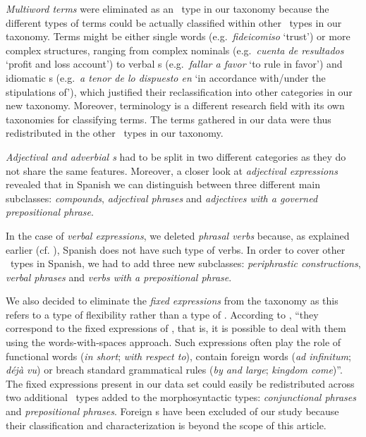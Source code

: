 \documentclass[output=paper]{langsci/langscibook}
\begin{document}
\textit{Multiword terms} were eliminated as an \mwe\ type in our taxonomy because the different types of terms could be actually classified within other \mwe\ types in our taxonomy.
Terms might be either single words (e.g.\ \textit{fideicomiso} `trust') or more complex structures, ranging from complex nominals (e.g.\ \textit{cuenta de resultados} `profit and loss account') to verbal \mwe s (e.g.\ \textit{fallar a favor} `to rule in favor') and idiomatic \mwe s (e.g.\ \textit{a tenor de lo dispuesto en} `in accordance with/under the stipulations of'), which justified their reclassification into other categories in our new taxonomy.
Moreover, terminology is a different research field with its own taxonomies for classifying terms.
The terms gathered in our data were thus redistributed in the other \mwe\ types in our taxonomy.


\textit{Adjectival and adverbial \mwe s} had to be split in two different categories as they do not share the same features.
Moreover, a closer look at \textit{adjectival expressions} revealed that in Spanish we can distinguish between three different main subclasses: \textit{compounds}, \textit{adjectival phrases} and \textit{adjectives with a governed prepositional phrase}.

In the case of \textit{verbal expressions}, we deleted \textit{phrasal verbs} because, as explained earlier (cf. ), Spanish does not have such type of verbs.
In order to cover other \mwe\ types in Spanish, we had to add three new subclasses: \textit{periphrastic constructions}, \textit{verbal phrases} and \textit{verbs with a prepositional phrase}.

We also decided to eliminate the \textit{fixed expressions} from the taxonomy as this refers to a type of flexibility rather than a type of \mwe.
According to \citet{Ramisch:2015}, ``they correspond to the fixed expressions of 
\citet{Sag:2002},
that is, it is possible to deal with them using the words-with-spaces approach. Such expressions often play the role of functional words (\textit{in short}; \textit{with respect to}), contain foreign words (\textit{ad infinitum}; \textit{déjà vu}) or breach standard grammatical rules (\textit{by and large}; \textit{kingdom come})''. 
The fixed expressions present in our data set could easily be redistributed across two additional \mwe\ types added to the morphosyntactic types: \textit{conjunctional phrases} and \textit{prepositional phrases}.
Foreign \mwe s have been excluded of our study because their classification and characterization is beyond the scope of this article.
\end{document}
